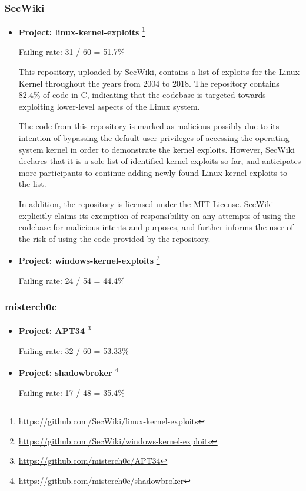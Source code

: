 \documentclass[]{acmart}
\begin{document}
\subsubsection{SecWiki}
\begin{itemize}
    \item { \bf Project: linux-kernel-exploits }\footnote{\url{https://github.com/SecWiki/linux-kernel-exploits}}

    Failing rate: 31 / 60 = 51.7\%

    This repository, uploaded by SecWiki, contains a list of exploits for the Linux Kernel throughout the years from 2004 to 2018. The repository contains 82.4\% of code in C, indicating that the codebase is targeted towards exploiting lower-level aspects of the Linux system. 

    The code from this repository is marked as malicious possibly due to its intention of bypassing the default user privileges of accessing the operating system kernel in order to demonstrate the kernel exploits. However, SecWiki declares that it is a sole list of identified kernel exploits so far, and anticipates more participants to continue adding newly found Linux kernel exploits to the list. 

    In addition, the repository is licensed under the MIT License. SecWiki explicitly claims its exemption of responsibility on any attempts of using the codebase for malicious intents and purposes, and further informs the user of the risk of using the code provided by the repository. 

    \item { \bf Project: windows-kernel-exploits }\footnote{\url{https://github.com/SecWiki/windows-kernel-exploits}}
    
    Failing rate: 24 / 54 = 44.4\%
\end{itemize}

\subsubsection{misterch0c}
\begin{itemize}
    \item { \bf Project: APT34 }\footnote{\url{ https://github.com/misterch0c/APT34}}
    
    Failing rate: 32 / 60 = 53.33\%
    
    \item { \bf Project: shadowbroker }\footnote{\url{https://github.com/misterch0c/shadowbroker}}
    
    Failing rate: 17 / 48 = 35.4\%
\end{itemize}
\end{document}

